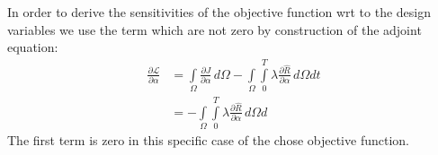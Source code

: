 In order to derive the sensitivities of the objective function wrt to the design variables we use the term which are not zero by construction of the adjoint equation: 
\begin{align}
\frac{\partial\mathcal{L}}{\partial \alpha} &= \int\limits_{\Omega}  \frac{\partial J}{\partial \alpha} \,d\Omega 
- \int\limits_{\Omega}\int\limits_{0}^{T} \lambda \frac{\partial \hat{R}}{\partial \alpha} \,d\Omega dt \\
&=- \int\limits_{\Omega}\int\limits_{0}^{T} \lambda \frac{\partial \hat{R}}{\partial \alpha} \,d\Omega d
\end{align}
The first term is zero in this specific case of the chose objective function.
